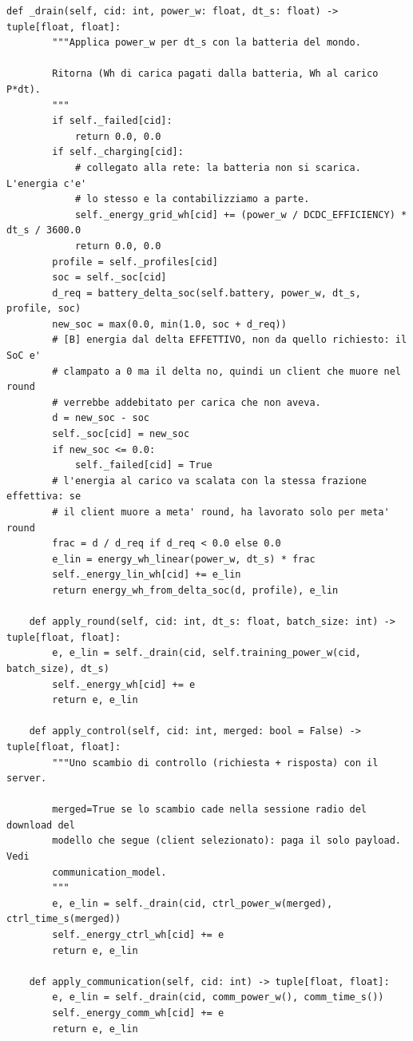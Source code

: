 \documentclass[11pt,a4paper]{article}
\begin{document}
\begin{lstlisting}[style=py,firstnumber=362,caption={\texttt{tesifl/device/world\_state.py}, lines 362--423}]
    def _drain(self, cid: int, power_w: float, dt_s: float) -> tuple[float, float]:
        """Applica power_w per dt_s con la batteria del mondo.

        Ritorna (Wh di carica pagati dalla batteria, Wh al carico P*dt).
        """
        if self._failed[cid]:
            return 0.0, 0.0
        if self._charging[cid]:
            # collegato alla rete: la batteria non si scarica. L'energia c'e'
            # lo stesso e la contabilizziamo a parte.
            self._energy_grid_wh[cid] += (power_w / DCDC_EFFICIENCY) * dt_s / 3600.0
            return 0.0, 0.0
        profile = self._profiles[cid]
        soc = self._soc[cid]
        d_req = battery_delta_soc(self.battery, power_w, dt_s, profile, soc)
        new_soc = max(0.0, min(1.0, soc + d_req))
        # [B] energia dal delta EFFETTIVO, non da quello richiesto: il SoC e'
        # clampato a 0 ma il delta no, quindi un client che muore nel round
        # verrebbe addebitato per carica che non aveva.
        d = new_soc - soc
        self._soc[cid] = new_soc
        if new_soc <= 0.0:
            self._failed[cid] = True
        # l'energia al carico va scalata con la stessa frazione effettiva: se
        # il client muore a meta' round, ha lavorato solo per meta' round
        frac = d / d_req if d_req < 0.0 else 0.0
        e_lin = energy_wh_linear(power_w, dt_s) * frac
        self._energy_lin_wh[cid] += e_lin
        return energy_wh_from_delta_soc(d, profile), e_lin

    def apply_round(self, cid: int, dt_s: float, batch_size: int) -> tuple[float, float]:
        e, e_lin = self._drain(cid, self.training_power_w(cid, batch_size), dt_s)
        self._energy_wh[cid] += e
        return e, e_lin

    def apply_control(self, cid: int, merged: bool = False) -> tuple[float, float]:
        """Uno scambio di controllo (richiesta + risposta) con il server.

        merged=True se lo scambio cade nella sessione radio del download del
        modello che segue (client selezionato): paga il solo payload. Vedi
        communication_model.
        """
        e, e_lin = self._drain(cid, ctrl_power_w(merged), ctrl_time_s(merged))
        self._energy_ctrl_wh[cid] += e
        return e, e_lin

    def apply_communication(self, cid: int) -> tuple[float, float]:
        e, e_lin = self._drain(cid, comm_power_w(), comm_time_s())
        self._energy_comm_wh[cid] += e
        return e, e_lin


\end{lstlisting}
\end{document}
